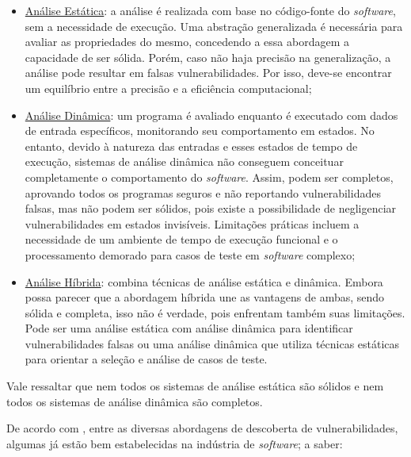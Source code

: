    \begin{itemize}
        \item \underline{Análise Estática}: a análise é realizada com base no código-fonte do \textit{software}, sem a necessidade de execução. Uma abstração generalizada é necessária para avaliar as propriedades do mesmo, concedendo a essa abordagem a capacidade de ser sólida. Porém, caso não haja precisão na generalização, a análise pode resultar em falsas vulnerabilidades. Por isso, deve-se encontrar um equilíbrio entre a precisão e a eficiência computacional;
        \item \underline{Análise Dinâmica}: um programa é avaliado enquanto é executado com dados de entrada específicos, monitorando seu comportamento em estados. No entanto, devido à natureza das entradas e esses estados de tempo de execução, sistemas de análise dinâmica não conseguem conceituar completamente o comportamento do \textit{software}. Assim, podem ser completos, aprovando todos os programas seguros e não reportando vulnerabilidades falsas, mas não podem ser sólidos, pois existe a possibilidade de negligenciar vulnerabilidades em estados invisíveis. Limitações práticas incluem a necessidade de um ambiente de tempo de execução funcional e o processamento demorado para casos de teste em \textit{software} complexo;
        \item \underline{Análise Híbrida}: combina técnicas de análise estática e dinâmica. Embora possa parecer que a abordagem híbrida une as vantagens de ambas, sendo sólida e completa, isso não é verdade, pois enfrentam também suas limitações. Pode ser uma análise estática com análise dinâmica para identificar vulnerabilidades falsas ou uma análise dinâmica que utiliza técnicas estáticas para orientar a seleção e análise de casos de teste.
    \end{itemize}

    Vale ressaltar que nem todos os sistemas de análise estática são sólidos e nem todos os sistemas de análise dinâmica são completos.
    
    De acordo com , entre as diversas abordagens de descoberta de vulnerabilidades, algumas já estão bem estabelecidas na indústria de \textit{software}; a saber:

